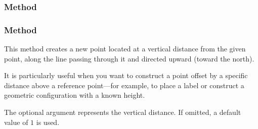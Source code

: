 \begin{tkzexample}[latex = 7cm]
\begin{center}
\end{center}

\end{tkzexample}

\subsubsection{Method }
\label{ssub:method_point_polar_deg}


\begin{tkzexample}[latex=7cm]
\begin{center}
\end{center}
\end{tkzexample}

\subsubsection{Method }
\label{ssub:example_method_point_north_d}

This method creates a new point located at a vertical distance from the given point, along the line passing through it and directed upward (toward the north).

\medskip
\noindent
It is particularly useful when you want to construct a point offset by a specific distance above a reference point—for example, to place a label or construct a geometric configuration with a known height.

\medskip
\noindent
The optional argument  represents the vertical distance. If omitted, a default value of $1$ is used.

